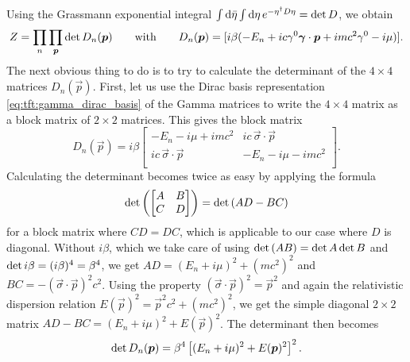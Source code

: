 Using the Grassmann exponential integral $\int \mathop{}\!\mathrm{d} \bar\eta \int \mathop{}\!\mathrm{d} \eta \, e^{-\eta^\dagger D \eta} = \operatorname{det}{D}$, we obtain
\begin{equation}
	Z = \prod_n \prod_{\bm{p}} \operatorname{det}{D_n({\bm{p}})}
	\qquad \text{with} \qquad
	D_n({\bm{p}}) = [i \beta( -E_n + i c \gamma^0 {\bm{\gamma}} \cdot {\bm{p}} + i mc^2 \gamma^0 - i \mu )].
\end{equation}
The next obvious thing to do is to try to calculate the determinant of the $4 \times 4$ matrices $D_n(\vec{p})$.
First, let us use the Dirac basis representation \eqref{eq:tft:gamma_dirac_basis} of the Gamma matrices to write the $4 \times 4$ matrix as a block matrix of $2 \times 2$ matrices.
This gives the block matrix
\begin{equation}
	D_n(\vec{p}) = i \beta \begin{bmatrix}
	                           -E_n - i \mu + i m c^2         & i c \, \vec{\sigma} \cdot \vec{p}    \\ 
	                           i c \, \vec{\sigma} \cdot \vec{p} & -E_n - i \mu - i m c^2 \\ 
	                       \end{bmatrix} .
\end{equation}
Calculating the determinant becomes twice as easy by applying the formula
\begin{equation}
	\operatorname{det} \left( \begin{bmatrix} A & B \\ C & D \\ \end{bmatrix} \right) = \operatorname{det}{(AD - BC)}
\end{equation}
for a block matrix where $CD = DC$, which is applicable to our case where $D$ is diagonal.
Without $i \beta$, which we take care of using $\operatorname{det}{(AB)} = \operatorname{det}{A} \operatorname{det}{B}$ and $\operatorname{det}{i \beta} = (i \beta)^4 = \beta^4$, we get
$AD = (E_n + i \mu)^2 + (mc^2)^2$ and $BC = - (\vec{\sigma} \cdot \vec{p})^2 c^2$.
Using the property $(\vec{\sigma} \cdot \vec{p})^2 = \vec{p}^2$  and again the relativistic dispersion relation $E(\vec{p})^2 = \vec{p}^2 c^2 + (mc^2)^2$, we get the simple diagonal $2 \times 2$ matrix
$AD - BC = (E_n + i \mu)^2 + E(\vec{p})^2$.
The determinant then becomes
\begin{equation}
	\operatorname{det} D_n({\bm{p}}) = \beta^4 \left[ (E_n + i \mu)^2 + E({\bm{p}})^2 \right]^2 .
\end{equation}

